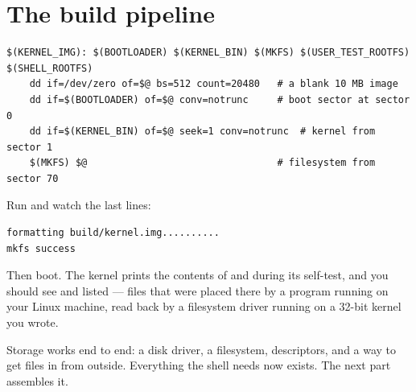 \section{The build pipeline}

\begin{lstlisting}[style=mk]
$(KERNEL_IMG): $(BOOTLOADER) $(KERNEL_BIN) $(MKFS) $(USER_TEST_ROOTFS) $(SHELL_ROOTFS)
	dd if=/dev/zero of=$@ bs=512 count=20480   # a blank 10 MB image
	dd if=$(BOOTLOADER) of=$@ conv=notrunc     # boot sector at sector 0
	dd if=$(KERNEL_BIN) of=$@ seek=1 conv=notrunc  # kernel from sector 1
	$(MKFS) $@                                 # filesystem from sector 70
\end{lstlisting}

\begin{center}
\end{center}

\begin{tryit}
Run  and watch the last lines:
\begin{lstlisting}[style=txt]
formatting build/kernel.img..........
mkfs success
\end{lstlisting}
Then boot. The kernel prints the contents of \cod{/} and  during its self-test, and you
should see  and  listed --- files that were placed there by a program
running on your Linux machine, read back by a filesystem driver running on a 32-bit kernel you
wrote.
\end{tryit}

\begin{summary}
Storage works end to end: a disk driver, a filesystem, descriptors, and a way to get files in from
outside. Everything the shell needs now exists. The next part assembles it.
\end{summary}
